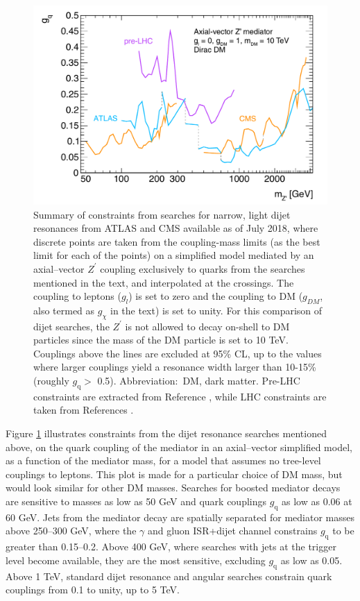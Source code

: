 \documentclass{ar-1col}
\newcommand{\gq}{$g_{\mathrm{q}}$\xspace}
\newcommand{\Zprime}{\ensuremath{{Z}^\prime}\xspace}
\begin{document}
{\begin{figure}[!htpb]
\includegraphics[width=\textwidth]{figures/CouplingMassPlot.pdf}
\caption{Summary of constraints from searches for narrow, light dijet
resonances from ATLAS and CMS available as of
July 2018, where discrete points are taken
from the coupling-mass limits (as the best limit for each of the points)
on a simplified model mediated by an
axial--vector $Z^\prime$ coupling exclusively to quarks from the
searches mentioned in the text, and interpolated at the crossings.
The coupling to leptons ($g_l$) is set to zero and the coupling to 
DM ($g_{DM}$, also termed as $g_{\chi}$ in the text) is set to unity. For this
comparison of dijet searches, the \Zprime is not allowed to decay on-shell
to DM particles since the mass of the DM particle is set to 10 TeV. 
Couplings above the lines are excluded at 95\% CL, up to the
values where larger couplings yield a resonance width larger than
10-15\% (roughly \gq $>$ 0.5). Abbreviation:\ DM, dark matter.
Pre-LHC constraints are extracted from Reference ,
while LHC constraints are taken from References \cite{Khachatryan:2016ecr,
Khachatryan:2015sja,ATLAS:2016bvn,Sirunyan:2017nvi,Aaboud:2018zba,
Sirunyan:2017nvi,Sirunyan:2018xlo,Aaboud:2018fzt,Aaboud:2017yvp}.
}
\label{fig:couplingmass}
\end{figure}

Figure \ref{fig:couplingmass} illustrates constraints from the
dijet resonance searches mentioned above, on the quark coupling of
the mediator in an axial--vector simplified model, as a function of
the mediator mass, for a model that assumes no tree-level
couplings to leptons. This plot is made for a particular choice of DM mass, 
but would look similar for other DM masses. 
Searches for boosted mediator decays are sensitive to masses as low as 50 GeV
and quark couplings \gq as low as 0.06 at 60 GeV. Jets from the
mediator decay are spatially separated for mediator masses above
250--300 GeV, where the $\gamma$ and gluon ISR+dijet channel
constrains \gq to be greater than 0.15--0.2. Above 400 GeV, where searches with
jets at the trigger level become available, they are the most
sensitive, excluding \gq as low as 0.05. Above 1 TeV, standard
dijet resonance and angular searches constrain quark couplings
from 0.1 to unity, up to 5 TeV.

}
\end{document}
